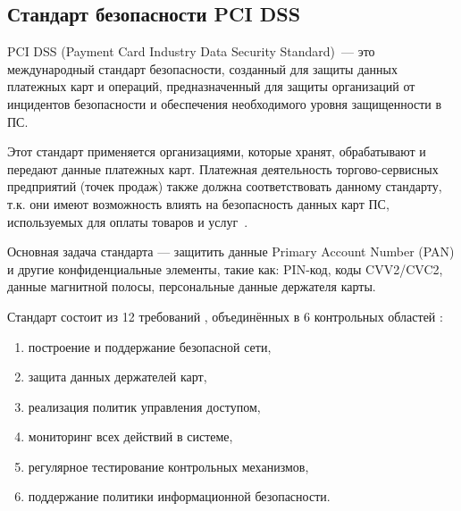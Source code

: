 


\subsection{Стандарт безопасности PCI DSS}

PCI DSS (Payment Card Industry Data Security Standard)~--- это международный стандарт безопасности, созданный для защиты данных платежных карт и операций, предназначенный для защиты организаций от инцидентов безопасности и обеспечения необходимого уровня защищенности в ПС.
 
Этот стандарт применяется организациями, которые хранят, обрабатывают и передают данные платежных карт.
Платежная деятельность торгово-сервисных предприятий (точек продаж) также должна соответствовать данному стандарту, т.к. они имеют возможность влиять на безопасность данных карт ПС, используемых для оплаты товаров и услуг~\cite{nspk_security}.

Основная задача стандарта — защитить данные Primary Account Number (PAN) и другие конфиденциальные элементы, такие как: PIN-код, коды CVV2/CVC2, данные магнитной полосы, персональные данные держателя карты.

Стандарт состоит из 12 требований , объединённых в 6 контрольных областей :

\begin{enumerate}
    \item построение и поддержание безопасной сети,
    \item защита данных держателей карт,
    \item реализация политик управления доступом,
    \item мониторинг всех действий в системе,
    \item регулярное тестирование контрольных механизмов,
    \item поддержание политики информационной безопасности.
\end{enumerate}

